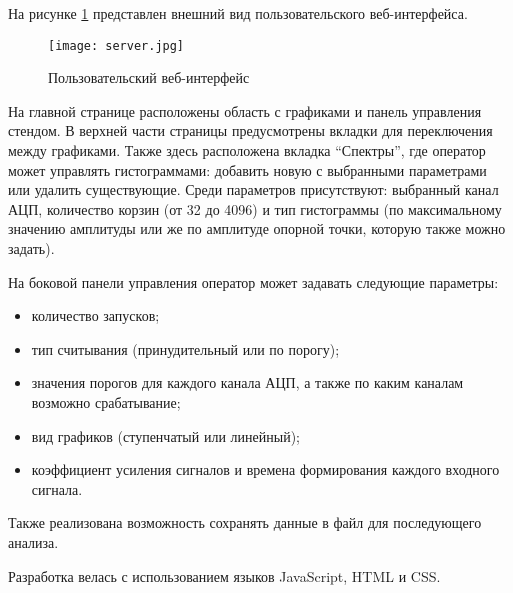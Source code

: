 На рисунке \ref{fig:server} представлен внешний вид пользовательского веб-интерфейса.\par
\begin{figure}[ht]
    \centering
    \texttt{[image: server.jpg]}
    \caption{Пользовательский веб-интерфейс}
    \label{fig:server}
\end{figure}
На главной странице расположены область с графиками и панель управления стендом. В верхней части страницы предусмотрены вкладки для переключения между графиками. Также здесь расположена вкладка ``Спектры'', где оператор может управлять гистограммами: добавить новую с выбранными параметрами или удалить существующие. Среди параметров присутствуют: выбранный канал АЦП, количество корзин (от 32 до 4096) и тип гистограммы (по максимальному значению амплитуды или же по амплитуде опорной точки, которую также можно задать).\par
На боковой панели управления оператор может задавать следующие параметры:\par
\begin{itemize}
    \item количество запусков;
    \item тип считывания (принудительный или по порогу);
    \item значения порогов для каждого канала АЦП, а также по каким каналам возможно срабатывание;
    \item вид графиков (ступенчатый или линейный);
    \item коэффициент усиления сигналов и времена формирования каждого входного сигнала.
\end{itemize}\par
Также реализована возможность сохранять данные в файл для последующего анализа.\par
Разработка велась с использованием языков JavaScript, HTML и CSS. \par
